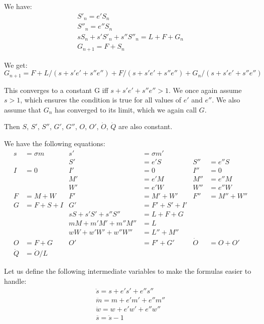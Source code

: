 \documentclass{article}
\begin{document}
We have:
\begin{gather*}
S'_n = e'S_n \\
S''_n = e''S_n \\
sS_n + s'S'_n + s''S''_n = L + F + G_n \\
G_{n+1} = F + S_n
\end{gather*}

We get:
\begin{equation}
G_{n+1} = F + L/(s+s'e'+s''e'') + F/(s+s'e'+s''e'') + G_n/(s+s'e'+s''e'')
\end{equation}

This converges to a constant G iff $s+s'e'+s''e'' > 1$. We once again
assume $s > 1$, which ensures the condition is true for all values of
$e'$ and $e''$. We also assume that $G_n$ has converged to its limit,
which we again call $G$.

Then $S$, $S'$, $S''$, $G'$, $G''$, $O$, $O'$,
$\dot{O}$, $\dot{Q}$ are also constant.

We have the following equations:
\begin{align*}
s &= \sigma m  &  s' &= \sigma m' \\
 & & S' &= e'S  &  S'' &= e''S \\
I &= 0  &  I' &= 0  &  I'' &= 0  \\
 & & M' &= e'M  &  M'' &= e''M \\
 & & W' &= e'W  &  W'' &= e''W \\
F &= M + W  &  F' &= M' + W'  &  F'' &= M'' + W'' \\
G &= F + S + I  &  G' &= F' + S' + I' \\
             &         & sS + s'S' + s''S'' &= L + F + G \\
             &         &  mM + m'M' + m''M'' &= L \\
             &         &  wW + w'W' + w''W'' &= L'' + M'' \\
O &= F + G  &  O' &= F' + G' & \dot{O} &= O + O' \\
\dot{Q} &= \dot{O}/L
\end{align*}

Let us define the following intermediate variables to make the
formulas easier to handle:
\begin{gather}
\ddot{s} = s + e's' + e''s'' \\
\ddot{m} = m + e'm' + e''m'' \\
\ddot{w} = w + e'w' + e''w'' \\
\overline{s} = \ddot{s} - 1
\end{gather}
\end{document}
